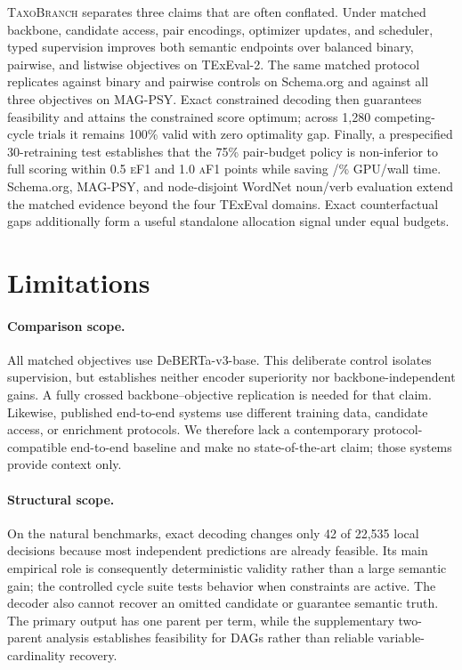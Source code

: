 \documentclass[11pt]{article}
\newcommand{\method}{\textsc{TaxoBranch}}
\newcommand{\ef}{\textsc{eF1}}
\newcommand{\af}{\textsc{aF1}}
\begin{document}
\method{} separates three claims that are often conflated. Under matched
backbone, candidate access, pair encodings, optimizer updates, and scheduler,
typed supervision improves both semantic endpoints over balanced binary,
pairwise, and listwise objectives on TExEval-2. The same matched protocol
replicates against binary and pairwise controls on Schema.org and against all
three objectives on MAG-PSY. Exact constrained decoding then guarantees
feasibility and attains the constrained score optimum; across 1,280
competing-cycle trials it remains 100\% valid with zero optimality gap. Finally,
a prespecified 30-retraining test establishes that the 75\% pair-budget policy is
non-inferior to full scoring within 0.5 \ef{} and 1.0 \af{} points while saving
\NIGPUSaving/\NIWallSaving\% GPU/wall time. Schema.org, MAG-PSY, and
node-disjoint WordNet noun/verb evaluation extend the matched evidence beyond
the four TExEval domains. Exact counterfactual gaps additionally form a useful
standalone allocation signal under equal budgets.

\section*{Limitations}

\paragraph{Comparison scope.}
All matched objectives use DeBERTa-v3-base. This deliberate control isolates
supervision, but establishes neither encoder superiority nor
backbone-independent gains. A fully crossed backbone--objective replication is
needed for that claim. Likewise, published end-to-end systems use different
training data, candidate access, or enrichment protocols. We therefore lack a
contemporary protocol-compatible end-to-end baseline and make no
state-of-the-art claim; those systems provide context only.

\paragraph{Structural scope.}
On the natural benchmarks, exact decoding changes only 42 of 22,535 local
decisions because most independent predictions are already feasible. Its main
empirical role is consequently deterministic validity rather than a large
semantic gain; the controlled cycle suite tests behavior when constraints are
active. The decoder also cannot recover an omitted candidate or
guarantee semantic truth. The primary output has one parent per term, while the
supplementary two-parent analysis establishes feasibility for DAGs rather than
reliable variable-cardinality recovery.
\end{document}
